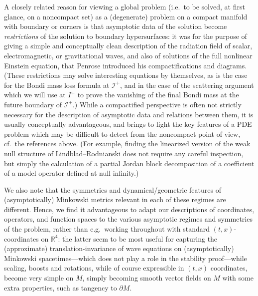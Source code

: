 \documentclass[reqno,11pt,letterpaper]{amsart}
\numberwithin{equation}{section}
\numberwithin{figure}{section}
\theoremstyle{definition}
\theoremstyle{remark}
\newcommand{\ms}{\mathscr}
\newcommand{\scri}{\ms I}
\newcommand{\R}{\mathbb{R}}
\newcommand{\pa}{\partial}
\begin{document}
A closely related reason for viewing a global problem (i.e.\ to be solved, at first glance, on a noncompact set) as a (degenerate) problem on a compact manifold with boundary or corners is that asymptotic data of the solution become \emph{restrictions} of the solution to boundary hypersurfaces: it was for the purpose of giving a simple and conceptually clean description of the radiation field of scalar, electromagnetic, or gravitational waves, and also of solutions of the full nonlinear Einstein equation, that Penrose introduced his compactifications and diagrams. (These restrictions may solve interesting equations by themselves, as is the case for the Bondi mass loss formula at $\scri^+$, and in the case of the scattering argument which we will use at $I^+$ to prove the vanishing of the final Bondi mass at the future boundary of $\scri^+$.) While a compactified perspective is often not strictly necessary for the description of asymptotic data and relations between them, it is usually conceptually advantageous, and brings to light the key features of a PDE problem which may be difficult to detect from the noncompact point of view, cf.\ the references above. (For example, finding the linearized version of the weak null structure of Lindblad--Rodnianski does not require any careful inspection, but simply the calculation of a partial Jordan block decomposition of a coefficient of a model operator defined at null infinity.)

We also note that the symmetries and dynamical/geometric features of (asymptotically) Minkowski metrics relevant in each of these regimes are different. Hence, we find it advantageous to adapt our descriptions of coordinates, operators, and function spaces to the various asymptotic regimes and symmetries of the problem, rather than e.g.\ working throughout with standard $(t,x)$-coordinates on $\R^4$: the latter seem to be most useful for capturing the (approximate) translation-invariance of wave equations on (asymptotically) Minkowski spacetimes---which does not play a role in the stability proof---while scaling, boosts and rotations, while of course expressible in $(t,x)$ coordinates, become very simple on $M$, simply becoming smooth vector fields on $M$ with some extra properties, such as tangency to $\pa M$.
\end{document}
